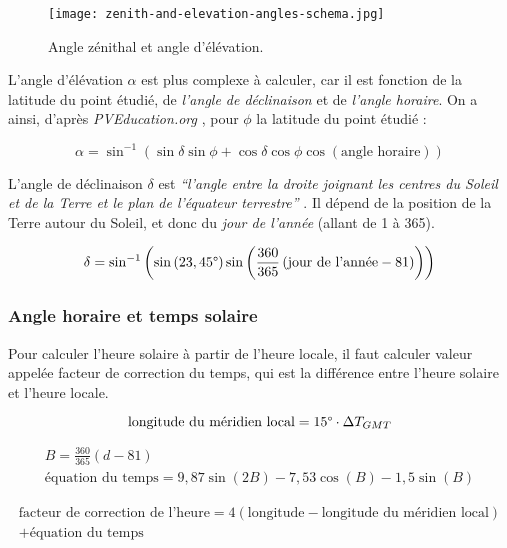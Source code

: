 \documentclass[12pt]{article}
\begin{document}
 \begin{figure}[H]
	\centerline{\texttt{[image: zenith-and-elevation-angles-schema.jpg]}}
	\caption{Angle zénithal et angle d'élévation.}
	\label{fig:elevation-and-zenith-angle}
\end{figure}

L'angle d'élévation $\alpha$ est plus complexe à calculer, car il est fonction de la latitude du point étudié, de \emph{l'angle de déclinaison} et de \emph{l'angle horaire}. On a ainsi, d'après \emph{PVEducation.org} \cite{pos_elevation_angle}, pour $\phi$ la latitude du point étudié :

\[
	\alpha = \sin^{-1} \left(
		\sin \delta \sin \phi +
		\cos \delta \cos \phi \cos \left( \text{angle horaire} \right)
	\right)
\]

L'angle de déclinaison $\delta$ est \emph{``l'angle entre la droite joignant les centres du Soleil et de la Terre et le plan de l'équateur terrestre''} \cite{mouvement_terre}. Il dépend de la position de la Terre autour du Soleil, et donc du \emph{jour de l'année} (allant de 1 à 365).

\[
	\delta = \sin^{-1} \left(
		\sin \left( 23,45\degree \right)
		\sin \left(
			\frac{360}{365}
			\left(
				\text{jour de l'année} - 81
			\right)
		\right)
	\right)
\]



\subsubsection{Angle horaire et temps solaire} %


Pour calculer l'heure solaire à partir de l'heure locale, il faut calculer valeur appelée facteur de correction du temps, qui est la différence entre l'heure solaire et l'heure locale.


\[
	\text{longitude du méridien local} = 15 \degree \cdot \Delta T_{GMT}
\]

\begin{gather*}
	B = \frac{360}{365} \left( d - 81 \right) \\
	\text{équation du temps} = 9,87 \sin \left( 2B \right) - 7,53 \cos \left( B \right) - 1,5 \sin \left( B \right)
\end{gather*}

\begin{multline*}
	\text{facteur de correction de l'heure} = 4 \left( \text{longitude} - \text{longitude du méridien local} \right) \\ + \text{équation du temps}
\end{multline*}
\end{document}

